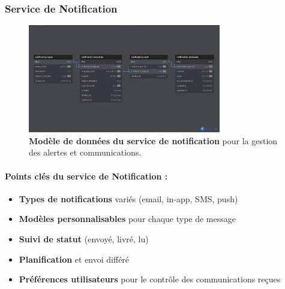 \subsubsection{Service de Notification}
\begin{figure}[H]
  \centering
  \includegraphics[width=0.75\textwidth,keepaspectratio]{week_1_img/services_db_screanshots/Screenshot 2025-06-06 at 15-08-13 Notification_Service.pdf.png}
  \caption{\textbf{Modèle de données du service de notification} pour la gestion des alertes et communications.}
  \label{fig:notification_service}
\end{figure}

\small
\paragraph{Points clés du service de Notification :}
\begin{itemize}[leftmargin=*,noitemsep,topsep=0pt]
  \item \textbf{Types de notifications} variés (email, in-app, SMS, push)
  \item \textbf{Modèles personnalisables} pour chaque type de message
  \item \textbf{Suivi de statut} (envoyé, livré, lu)
  \item \textbf{Planification} et envoi différé
  \item \textbf{Préférences utilisateurs} pour le contrôle des communications reçues
\end{itemize}
\normalsize

